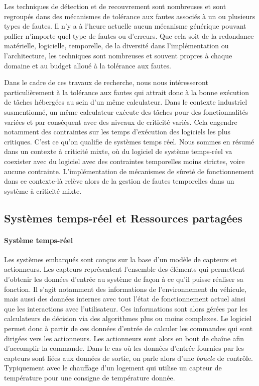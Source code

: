 \documentclass[french, a4paper, 11pt, twoside, pdftex]{StyleThese}
\begin{document}
		Les techniques de détection et de recouvrement sont nombreuses et sont regroupés dans des mécanismes de tolérance aux fautes associés à un ou plusieurs types de fautes. Il n’y a à l’heure actuelle aucun mécanisme générique pouvant pallier n’importe quel type de fautes ou d’erreurs. Que cela soit de la redondance matérielle, logicielle, temporelle, de la diversité dans l’implémentation ou l’architecture, les techniques sont nombreuses et souvent propres à chaque domaine et au budget alloué à la tolérance aux fautes.
		
		Dans le cadre de ces travaux de recherche, nous nous intéresseront particulièrement à la tolérance aux fautes qui attrait donc à la bonne exécution de tâches hébergées au sein d'un même calculateur. Dans le contexte industriel susmentionné, un même calculateur exécute des tâches pour des fonctionnalités variées et par conséquent avec des niveaux de criticité variés. Cela engendre notamment des contraintes sur les temps d'exécution des logiciels les plus critiques. C'est ce qu'on qualifie de systèmes temps réel. Nous sommes en résumé dans un contexte à criticité mixte, où du logiciel de système temps-réel va coexister avec du logiciel avec des contraintes temporelles moins strictes, voire aucune contrainte. L'implémentation de mécanismes de sûreté de fonctionnement dans ce contexte-là relève alors de la gestion de fautes temporelles dans un système à criticité mixte. 
		
\subsection{Systèmes temps-réel et Ressources partagées}
	\paragraph{Système temps-réel}
		Les systèmes embarqués sont conçus sur la base d'un modèle de capteurs et actionneurs. Les capteurs représentent l'ensemble des éléments qui permettent d'obtenir les données d'entrée au système de façon à ce qu'il puisse réaliser sa fonction. Il s'agit notamment des informations de l'environnement du véhicule, mais aussi des données internes avec tout l'état de fonctionnement actuel ainsi que les interactions avec l'utilisateur. Ces informations sont alors gérées par les calculateurs de décision via des algorithmes plus ou moins complexes. Le logiciel permet donc à partir de ces données d'entrée de calculer les commandes qui sont dirigées vers les actionneurs. Les actionneurs sont alors en bout de chaîne afin d'accomplir la commande. Dans le cas où les données d'entrée fournies par les capteurs sont liées aux données de sortie, on parle alors d'une \emph{boucle} de contrôle. Typiquement avec le chauffage d'un logement qui utilise un capteur de température pour une consigne de température donnée.
		
\end{document}

